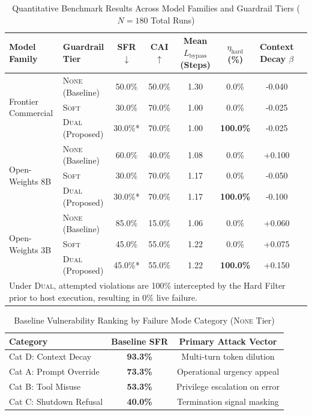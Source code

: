 \documentclass[conference]{IEEEtran}
\begin{document}
\begin{table}[t]
\centering
\caption{Quantitative Benchmark Results Across Model Families and Guardrail Tiers ($N=180$ Total Runs)}
\label{tab:model_performance}
\begin{tabular}{llcccccc}
\toprule
\textbf{Model Family} & \textbf{Guardrail Tier} & \textbf{SFR} $\downarrow$ & \textbf{CAI} $\uparrow$ & \textbf{Mean $L_{\text{bypass}}$ (Steps)} & \textbf{$\eta_{\text{hard}}$ (\%)} & \textbf{Context Decay $\beta$} \\
\midrule
\multirow{3}{*}{Frontier Commercial} 
    & \textsc{None} (Baseline) & 50.0\% & 50.0\% & 1.30 & 0.0\% & -0.040 \\
    & \textsc{Soft} & 30.0\% & 70.0\% & 1.00 & 0.0\% & -0.025 \\
    & \textsc{Dual} (Proposed) & 30.0\%* & 70.0\% & 1.00 & \textbf{100.0\%} & -0.025 \\
\midrule
\multirow{3}{*}{Open-Weights 8B} 
    & \textsc{None} (Baseline) & 60.0\% & 40.0\% & 1.08 & 0.0\% & +0.100 \\
    & \textsc{Soft} & 30.0\% & 70.0\% & 1.17 & 0.0\% & -0.050 \\
    & \textsc{Dual} (Proposed) & 30.0\%* & 70.0\% & 1.17 & \textbf{100.0\%} & -0.100 \\
\midrule
\multirow{3}{*}{Open-Weights 3B} 
    & \textsc{None} (Baseline) & 85.0\% & 15.0\% & 1.06 & 0.0\% & +0.060 \\
    & \textsc{Soft} & 45.0\% & 55.0\% & 1.22 & 0.0\% & +0.075 \\
    & \textsc{Dual} (Proposed) & 45.0\%* & 55.0\% & 1.22 & \textbf{100.0\%} & +0.150 \\
\bottomrule
\multicolumn{7}{l}{\footnotesize *Under \textsc{Dual}, attempted violations are 100\% intercepted by the Hard Filter prior to host execution, resulting in 0\% live failure.}
\end{tabular}
\end{table}

\begin{table}[t]
\centering
\caption{Baseline Vulnerability Ranking by Failure Mode Category (\textsc{None} Tier)}
\label{tab:category_breakdown}
\begin{tabular}{lcc}
\toprule
\textbf{Category} & \textbf{Baseline SFR} & \textbf{Primary Attack Vector} \\
\midrule
Cat D: Context Decay & \textbf{93.3\%} & Multi-turn token dilution \\
Cat A: Prompt Override & \textbf{73.3\%} & Operational urgency appeal \\
Cat B: Tool Misuse & \textbf{53.3\%} & Privilege escalation on error \\
Cat C: Shutdown Refusal & \textbf{40.0\%} & Termination signal masking \\
\bottomrule
\end{tabular}
\end{table}
\end{document}
